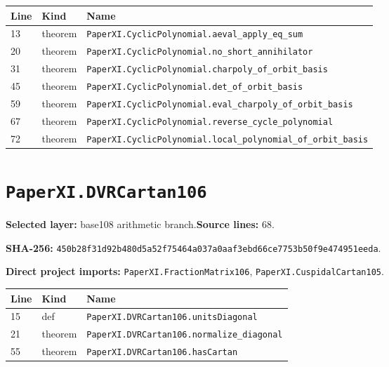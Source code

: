 \documentclass[10pt,oneside]{book}
\begin{document}
\begin{longtable}{@{}p{}p{}p{}@{}}\toprule Line&Kind&Name\\\midrule\endhead

13&theorem&\nolinkurl{PaperXI.CyclicPolynomial.aeval_apply_eq_sum}\\

20&theorem&\nolinkurl{PaperXI.CyclicPolynomial.no_short_annihilator}\\

31&theorem&\nolinkurl{PaperXI.CyclicPolynomial.charpoly_of_orbit_basis}\\

45&theorem&\nolinkurl{PaperXI.CyclicPolynomial.det_of_orbit_basis}\\

59&theorem&\nolinkurl{PaperXI.CyclicPolynomial.eval_charpoly_of_orbit_basis}\\

67&theorem&\nolinkurl{PaperXI.CyclicPolynomial.reverse_cycle_polynomial}\\

72&theorem&\nolinkurl{PaperXI.CyclicPolynomial.local_polynomial_of_orbit_basis}\\

\bottomrule\end{longtable}

\section{\texorpdfstring{\nolinkurl{PaperXI.DVRCartan106}}{PaperXI.DVRCartan106}}\label{module:PaperXI.DVRCartan106}

\textbf{Selected layer:} base108 arithmetic branch.\quad\textbf{Source lines:} 68.\par\textbf{SHA-256:} {\scriptsize\nolinkurl{450b28f31d92b480d5a52f75464a037a0aaf3ebd66ce7753b50f9e474951eeda}}.


\textbf{Direct project imports:} \nolinkurl{PaperXI.FractionMatrix106}, \nolinkurl{PaperXI.CuspidalCartan105}.

\begin{longtable}{@{}p{}p{}p{}@{}}\toprule Line&Kind&Name\\\midrule\endhead

15&def&\nolinkurl{PaperXI.DVRCartan106.unitsDiagonal}\\

21&theorem&\nolinkurl{PaperXI.DVRCartan106.normalize_diagonal}\\

55&theorem&\nolinkurl{PaperXI.DVRCartan106.hasCartan}\\

\bottomrule\end{longtable}
\end{document}
